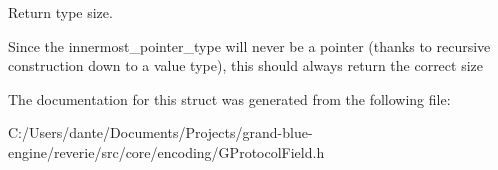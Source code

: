 Return type size. 

Since the innermost\+\_\+pointer\+\_\+type will never be a pointer (thanks to recursive construction down to a value type), this should always return the correct size 

The documentation for this struct was generated from the following file\+:\begin{DoxyCompactItemize}
\item 
C\+:/\+Users/dante/\+Documents/\+Projects/grand-\/blue-\/engine/reverie/src/core/encoding/G\+Protocol\+Field.\+h\end{DoxyCompactItemize}
